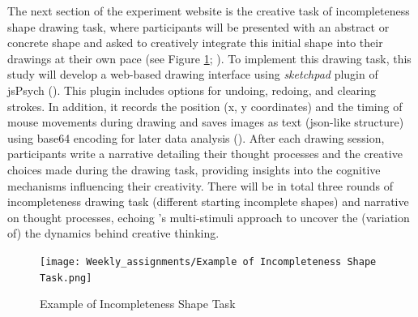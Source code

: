 \documentclass[../Proposal.tex]{subfiles}
\begin{document}
The next section of the experiment website is the creative task of incompleteness shape drawing task, where participants will be presented with an abstract or concrete shape and asked to creatively integrate this initial shape into their drawings at their own pace (see Figure \ref{fig: Example of Incompleteness Shape Task}; \cite{patterson_audra_2023}). To implement this drawing task, this study will develop a web-based drawing interface using \textit{sketchpad} plugin of jsPsych (\cite{leeuw_jspsych_2023}). This plugin includes options for undoing, redoing, and clearing strokes. In addition, it records the position (x, y coordinates) and the timing of mouse movements during drawing and saves images as text (json-like structure) using base64 encoding for later data analysis (\cite{bainbridge_tutorial_2022}). After each drawing session, participants write a narrative detailing their thought processes and the creative choices made during the drawing task, providing insights into the cognitive mechanisms influencing their creativity. There will be in total three rounds of incompleteness drawing task (different starting incomplete shapes) and narrative on thought processes, echoing \textcite{barbot_dynamics_2018}'s multi-stimuli approach to uncover the (variation of) the dynamics behind creative thinking.

\begin{figure}
    \centering
    \texttt{[image: Weekly\_assignments/Example of Incompleteness Shape Task.png]}
    \caption{Example of Incompleteness Shape Task}
    \label{fig: Example of Incompleteness Shape Task}
\end{figure}

\end{document}
